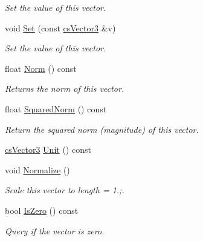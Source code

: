 \begin{DoxyCompactItemize}
\begin{DoxyCompactList}\small\item\em Set the value of this vector. \end{DoxyCompactList}\item 
void \hyperlink{classcsVector3_a9601245e9d3b7ab95759c5eb3a0c3347}{Set} (const \hyperlink{classcsVector3}{cs\+Vector3} \&v)\hypertarget{classcsVector3_a9601245e9d3b7ab95759c5eb3a0c3347}{}\label{classcsVector3_a9601245e9d3b7ab95759c5eb3a0c3347}

\begin{DoxyCompactList}\small\item\em Set the value of this vector. \end{DoxyCompactList}\item 
float \hyperlink{classcsVector3_a42b1546a61c4fd76ec17c50592fcad1e}{Norm} () const \hypertarget{classcsVector3_a42b1546a61c4fd76ec17c50592fcad1e}{}\label{classcsVector3_a42b1546a61c4fd76ec17c50592fcad1e}

\begin{DoxyCompactList}\small\item\em Returns the norm of this vector. \end{DoxyCompactList}\item 
float \hyperlink{classcsVector3_a4f8fb0ed2df4d38898bbcda746c47552}{Squared\+Norm} () const \hypertarget{classcsVector3_a4f8fb0ed2df4d38898bbcda746c47552}{}\label{classcsVector3_a4f8fb0ed2df4d38898bbcda746c47552}

\begin{DoxyCompactList}\small\item\em Return the squared norm (magnitude) of this vector. \end{DoxyCompactList}\item 
\hyperlink{classcsVector3}{cs\+Vector3} \hyperlink{classcsVector3_adfe6a123b665375450d78bf47eee2b77}{Unit} () const 
\item 
void \hyperlink{classcsVector3_a59c1a6333abbb77268b7e661b3be36b5}{Normalize} ()\hypertarget{classcsVector3_a59c1a6333abbb77268b7e661b3be36b5}{}\label{classcsVector3_a59c1a6333abbb77268b7e661b3be36b5}

\begin{DoxyCompactList}\small\item\em Scale this vector to length = 1.;. \end{DoxyCompactList}\item 
bool \hyperlink{classcsVector3_af990b4b98a7e26f25dc3765feef5e08d}{Is\+Zero} () const \hypertarget{classcsVector3_af990b4b98a7e26f25dc3765feef5e08d}{}\label{classcsVector3_af990b4b98a7e26f25dc3765feef5e08d}

\begin{DoxyCompactList}\small\item\em Query if the vector is zero. \end{DoxyCompactList}\end{DoxyCompactItemize}
